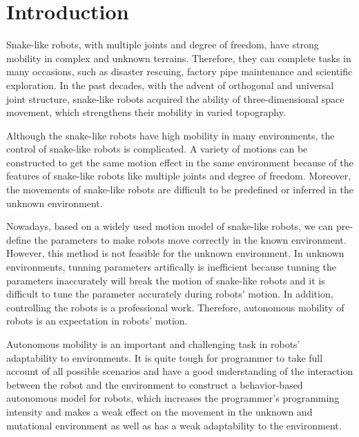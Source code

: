 \section{Introduction}
Snake-like robots, with multiple joints and degree of freedom, 
have strong mobility in complex and unknown terrains\cite{Chirikjian1995The}. 
Therefore, they can complete tasks in many occasions, such as disaster 
rescuing\cite{DogAndSnake}, factory pipe maintenance\cite{ACMTutorial} 
and scientific exploration\cite{Kuwada2007Snake}. In the past decades, 
with the advent of orthogonal and universal joint structure\cite{1014757}\cite{Date2005Control}\cite{GaitBasedCompliant}, 
snake-like robots acquired the ability of three-dimensional space movement, 
which strengthens their mobility in varied topography. 

Although the snake-like robots have high mobility in many environments, the control of snake-like robots is complicated. A variety of motions can be constructed to get the same motion effect in the same environment because of the features of snake-like robots like multiple joints and degree of freedom. Moreover, the movements of snake-like robots are difficult to be predefined or inferred in the unknown environment.

Nowadays, based on a widely used motion model\cite{HiroseSine} of snake-like robots, we can pre-define the parameters to make robots move correctly in the known environment. However, this method is not feasible for the unknown environment. In unknown environments, tunning parameters artifically is inefficient because tunning the parameters inaccurately will break the motion of snake-like robots and it is difficult to tune the parameter accurately during robots' motion. In addition, controlling the robots is a professional work. Therefore, autonomous mobility of robots is an expectation in robots' motion.

Autonomous mobility is an important and challenging task in robots' adaptability to environments. It is quite tough for programmer to take full account of all possible scenarios and have a good understanding of the interaction between the robot and the environment to construct a behavior-based autonomous model for robots, which increases the programmer's programming intensity and makes a weak effect on the movement in the unknown and mutational environment as well as has a weak adaptability to the environment.


